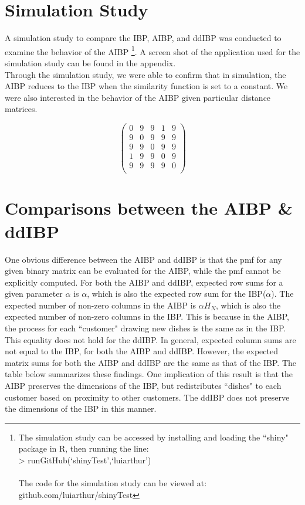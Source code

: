 \section{Simulation Study}
A simulation study to compare the IBP, AIBP, and ddIBP was conducted to examine
the behavior of the AIBP
\footnote{The simulation study can be accessed by installing and loading the
``shiny" package in R, then running the line: \\
> runGitHub(`shinyTest',`luiarthur')\\\\
The code for the simulation study can be viewed at: \\
github.com/luiarthur/shinyTest}. A screen shot of the application used for the 
simulation study can be found in the appendix. \\
\noindent
Through the simulation study, we were able to confirm that in simulation, the
AIBP reduces to the IBP when the similarity function is set to a constant. We 
were also interested in the behavior of the AIBP given particular distance 
matrices. 

\begin{table}[ht]
\centering
\[
  \begin{pmatrix}{}
    0 & 9 & 9 & 1 & 9 \\ 
    9 & 0 & 9 & 9 & 9 \\ 
    9 & 9 & 0 & 9 & 9 \\ 
    1 & 9 & 9 & 0 & 9 \\ 
    9 & 9 & 9 & 9 & 0 \\ 
  \end{pmatrix}
\]
\end{table}

\section{Comparisons between the AIBP \& ddIBP}
One obvious difference between the AIBP and ddIBP is that the pmf for any given
binary matrix can be evaluated for the AIBP, while the pmf cannot be explicitly
computed. For both the AIBP and ddIBP, expected row sums for a given parameter
$\alpha$ is $\alpha$, which is also the expected row sum for the IBP($\alpha$).
The expected number of non-zero columns in the AIBP is $\alpha H_N$, which is
also the expected number of non-zero columns in the IBP. This is because in the
AIBP, the process for each ``customer" drawing new dishes is the same as in the
IBP. This equality does not hold for the ddIBP. In general, expected column
sums are not equal to the IBP, for both the AIBP and ddIBP. However, the
expected matrix sums for both the AIBP and ddIBP are the same as that of the
IBP. The table below summarizes these findings. One implication of this result
is that the AIBP preserves the dimensions of the IBP, but redistributes
``dishes" to each customer based on proximity to other customers. The ddIBP
does not preserve the dimensions of the IBP in this manner. \\

